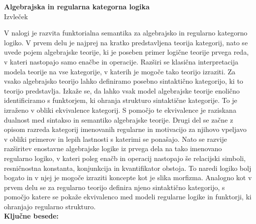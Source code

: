 \documentclass[12pt,a4paper]{book}
\begin{document}
%
\frontmatter%

\cleardoublepage
\begin{center}
{\bf Algebrajska in regularna kategorna logika}\\[3mm]
{\sc  Izvleček}
\end{center}
\vspace{10mm}
V nalogi je razvita funktorialna semantika za algebrajsko in regularno kategorno logiko.
V prvem delu je najprej na kratko predstavljena teorija kategorij, nato se uvede
pojem algebrajske teorije, ki je poseben primer logične teorije prvega reda, v kateri
nastopajo samo enačbe in operacije. Razširi se klasična interpretacija modela teorije
na vse kategorije, v katerih je mogoče tako teorijo izraziti.
Za vsako algebrajsko teorijo lahko definiramo posebno sintaktično kategorijo,
ki to teorijo predstavlja. Izkaže se, da lahko vsak model algebrajske teorije
enolično identificiramo s funktorjem, ki ohranja strukturo sintaktične kategorije.
To je izraženo v obliki ekvivalence kategorij. S pomočjo te ekvivalence je raziskana
dualnost med sintakso in semantiko algebrajske teorije.
Drugi del se začne z opisom razreda kategorij imenovanih regularne in motivacijo
za njihovo vpeljavo v obliki primerov in lepih lastnosti s katerimi se ponašajo.
Nato se razvije razširitev enostavne algebrajske logike iz prvega dela na tako imenovano
regularno logiko, v kateri poleg enačb in operacij nastopajo še relacijski simboli,
resničnostna konstanta, konjunkcija in kvantifikator obstoja. To naredi logiko
bolj bogato in v njej je mogoče izraziti koncepte kot je slika morfizma.
Analogno kot v prvem delu se za regularno teorijo definira njeno sintaktično kategorijo,
s pomočjo katere se pokaže ekvivalenco med modeli regularne logike in funktorji, ki
ohranjajo regularno strukturo.\\[10mm]
{\bf Ključne besede:} \tkeywords \\[3mm]
\cleardoublepage
\end{document}
